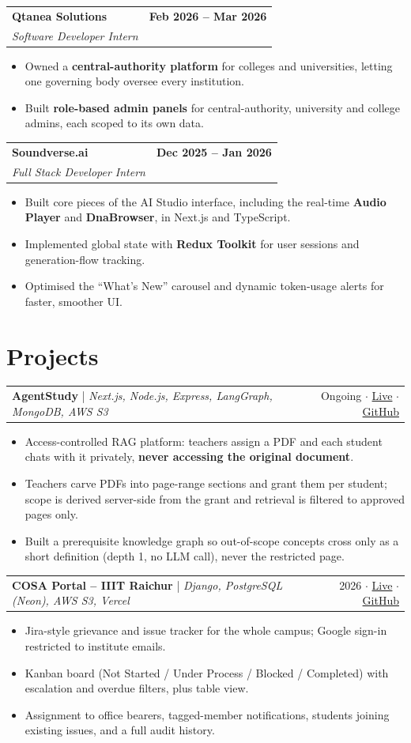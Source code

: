 \documentclass[letterpaper,10pt]{article}
\makeatletter
\newcommand{\entry}[4]{%
  \begin{tabularx}{\linewidth}{@{}X r@{}}
    \textbf{#1} & \textbf{#2} \\
    \textit{\small #3} & \textit{\small\color{muted} #4} \\
  \end{tabularx}\vspace{-3pt}}
\newcommand{\project}[3]{%
  \begin{tabularx}{\linewidth}{@{}X r@{}}
    \textbf{#1} {\small\color{muted}| \textit{#2}} & \small #3 \\
  \end{tabularx}\vspace{-3pt}}
\newenvironment{points}{\begin{itemize}[leftmargin=12pt,itemsep=0.5pt,topsep=2pt,parsep=0pt,label={\small\textbullet}]\small}{\end{itemize}\vspace{2pt}}
\makeatother
\begin{document}
\entry{Qtanea Solutions}{Feb 2026 -- Mar 2026}{Software Developer Intern}{}
\begin{points}
  \item Owned a \textbf{central-authority platform} for colleges and universities, letting one governing body oversee every institution.
  \item Built \textbf{role-based admin panels} for central-authority, university and college admins, each scoped to its own data.
\end{points}

\entry{Soundverse.ai}{Dec 2025 -- Jan 2026}{Full Stack Developer Intern}{}
\begin{points}
  \item Built core pieces of the AI Studio interface, including the real-time \textbf{Audio Player} and \textbf{DnaBrowser}, in Next.js and TypeScript.
  \item Implemented global state with \textbf{Redux Toolkit} for user sessions and generation-flow tracking.
  \item Optimised the ``What's New'' carousel and dynamic token-usage alerts for faster, smoother UI.
\end{points}

\section{Projects}
\project{AgentStudy}{Next.js, Node.js, Express, LangGraph, MongoDB, AWS S3}{{\color{muted}Ongoing} $\cdot$ \href{https://studyagent.krishnafauj.in}{Live} $\cdot$ \href{https://github.com/krishnafauj/Study_Agent}{GitHub}}
\begin{points}
  \item Access-controlled RAG platform: teachers assign a PDF and each student chats with it privately, \textbf{never accessing the original document}.
  \item Teachers carve PDFs into page-range sections and grant them per student; scope is derived server-side from the grant and retrieval is filtered to approved pages only.
  \item Built a prerequisite knowledge graph so out-of-scope concepts cross only as a short definition (depth 1, no LLM call), never the restricted page.
\end{points}

\project{COSA Portal -- IIIT Raichur}{Django, PostgreSQL (Neon), AWS S3, Vercel}{{\color{muted}2026} $\cdot$ \href{https://cosaiiitr.krishnafauj.in/board}{Live} $\cdot$ \href{https://github.com/krishnafauj/cosa}{GitHub}}
\begin{points}
  \item Jira-style grievance and issue tracker for the whole campus; Google sign-in restricted to institute emails.
  \item Kanban board (Not Started / Under Process / Blocked / Completed) with escalation and overdue filters, plus table view.
  \item Assignment to office bearers, tagged-member notifications, students joining existing issues, and a full audit history.
\end{points}
\end{document}
